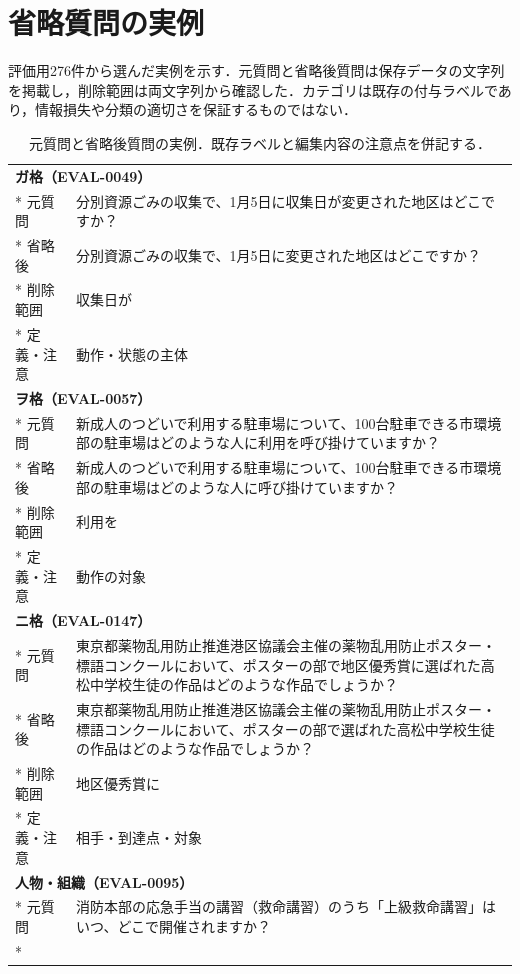 \documentclass[twocolumn,a4paper,10pt]{ltjsarticle}
\begin{document}
\clearpage
\onecolumn
\section{省略質問の実例}
\label{app:examples}
評価用276件から選んだ実例を示す．元質問と省略後質問は保存データの文字列を掲載し，削除範囲は両文字列から確認した．カテゴリは既存の付与ラベルであり，情報損失や分類の適切さを保証するものではない．
\begingroup\small\setlength{\tabcolsep}{5pt}
\begin{longtable}{p{22mm}p{145mm}}
\caption{元質問と省略後質問の実例．既存ラベルと編集内容の注意点を併記する．}\label{tab:examples}\\
\toprule
\multicolumn{2}{l}{\textbf{ガ格（EVAL-0049）}} \\*
元質問 & 分別資源ごみの収集で、1月5日に収集日が変更された地区はどこですか？ \\*
省略後 & 分別資源ごみの収集で、1月5日に変更された地区はどこですか？ \\*
削除範囲 & 収集日が \\*
定義・注意 & 動作・状態の主体 \\
\toprule
\multicolumn{2}{l}{\textbf{ヲ格（EVAL-0057）}} \\*
元質問 & 新成人のつどいで利用する駐車場について、100台駐車できる市環境部の駐車場はどのような人に利用を呼び掛けていますか？ \\*
省略後 & 新成人のつどいで利用する駐車場について、100台駐車できる市環境部の駐車場はどのような人に呼び掛けていますか？ \\*
削除範囲 & 利用を \\*
定義・注意 & 動作の対象 \\
\toprule
\multicolumn{2}{l}{\textbf{ニ格（EVAL-0147）}} \\*
元質問 & 東京都薬物乱用防止推進港区協議会主催の薬物乱用防止ポスター・標語コンクールにおいて、ポスターの部で地区優秀賞に選ばれた高松中学校生徒の作品はどのような作品でしょうか？ \\*
省略後 & 東京都薬物乱用防止推進港区協議会主催の薬物乱用防止ポスター・標語コンクールにおいて、ポスターの部で選ばれた高松中学校生徒の作品はどのような作品でしょうか？ \\*
削除範囲 & 地区優秀賞に \\*
定義・注意 & 相手・到達点・対象 \\
\toprule
\multicolumn{2}{l}{\textbf{人物・組織（EVAL-0095）}} \\*
元質問 & 消防本部の応急手当の講習（救命講習）のうち「上級救命講習」はいつ、どこで開催されますか？ \\*

\end{longtable}
\end{document}
